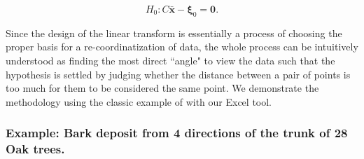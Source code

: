 \documentclass[article]{jss}
\numberwithin{equation}{subsection}
\begin{document}
        \[H_0: C\bar{\textbf{x}} - \boldsymbol{\xi}_0 = \textbf{0}.\]
        
        
        
        Since the design of the linear transform is essentially a process of choosing the proper basis for a re-coordinatization of data, the whole process can be intuitively understood as finding the most direct ``angle" to view the data such that the hypothesis is settled by judging whether the distance between a pair of points is too much for them to be considered the same point. We demonstrate the methodology using the classic example of \cite{rao1948corkboring} with our Excel tool.
        
        
        
        \subsubsection{Example: Bark deposit from 4 directions of the trunk of 28 Oak trees.}
        
\end{document}
